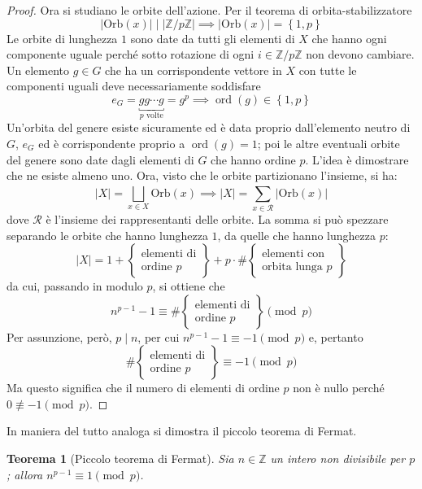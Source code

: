 \documentclass[11pt]{scrartcl}
\theoremstyle{style}
\newtheorem{teorema}{Teorema}[section]
\numberwithin{equation}{subsection}
\begin{document}
\begin{proof}
		Ora si studiano le orbite dell'azione.
		Per il teorema di orbita-stabilizzatore
		\[
			\lvert \mathrm{Orb} (x) \rvert  \mid \lvert \mathbb{Z}/ p \mathbb{Z} \rvert \implies \lvert \mathrm{Orb} (x)  \rvert  = \left\{ 1,p \right\} 
		\] 
		Le orbite di lunghezza $1$ sono date da tutti gli elementi di $X$ che hanno ogni componente uguale perch\'e sotto rotazione di ogni $i \in \mathbb{Z}/p\mathbb{Z}$ non devono cambiare.
		Un elemento $g \in G$ che ha un corrispondente vettore in $X$ con tutte le componenti uguali deve necessariamente soddisfare
		\[
			e_G=\underbracket{g g \cdots g}_{p \text{ volte}} = g^p \implies \operatorname{ord}(g) \in \left\{ 1,p \right\} 
		\] 
		Un'orbita del genere esiste sicuramente ed \`e data proprio dall'elemento neutro di $G$, $e_{G} $ ed \`e corrispondente proprio a $\operatorname{ord}(g) =1$; poi le altre eventuali orbite del genere sono date dagli elementi di $G$ che hanno ordine $p$.
		L'idea \`e dimostrare che ne esiste almeno uno.
		Ora, visto che le orbite partizionano l'insieme, si ha:
		\[
		\lvert X \rvert  = \bigsqcup_{x \in X} \mathrm{Orb} (x) \implies \lvert X \rvert  = \sum_{x \in \mathcal{R} }^{} \lvert \mathrm{Orb}(x)  \rvert 
		\] 
		dove $\mathcal{R} $ \`e l'insieme dei rappresentanti delle orbite.
		La somma si pu\`o spezzare separando le orbite che hanno lunghezza $1$, da quelle che hanno lunghezza $p$:
		\[
			\lvert X \rvert  = 1 + \left\{ \substack{\displaystyle \text{elementi di}\\\displaystyle  \text{ordine } p} \right\} + p \cdot \# \left\{ \substack{\displaystyle \text{elementi con}\\ \displaystyle \text{orbita lunga } p} \right\}
		\] 
		da cui, passando in modulo $p$, si ottiene che
		\[
		n^{p-1} - 1 \equiv  \# \left\{ \substack{\displaystyle \text{elementi di}\\\displaystyle  \text{ordine } p} \right\} \pmod{p} 
		\] 
		Per assunzione, per\`o, $p  \mid  n$, per cui $n^{p-1} - 1 \equiv -1 \pmod{p} $ e, pertanto
		\[
		 \# \left\{ \substack{\displaystyle \text{elementi di}\\\displaystyle  \text{ordine } p} \right\}\equiv -1 \pmod{p}
		\] 
	Ma questo significa che il numero di elementi di ordine $p$ non \`e nullo perch\'e $0 \not \equiv -1 \pmod{p} $.
	\end{proof}
In maniera del tutto analoga si dimostra il piccolo teorema di Fermat.
\begin{teorema}
	[Piccolo teorema di Fermat]
	Sia $n \in \mathbb{Z}$ un intero non divisibile per $p$; allora $n^{p-1} \equiv 1 \pmod{p} $.
\end{teorema}
\end{document}
